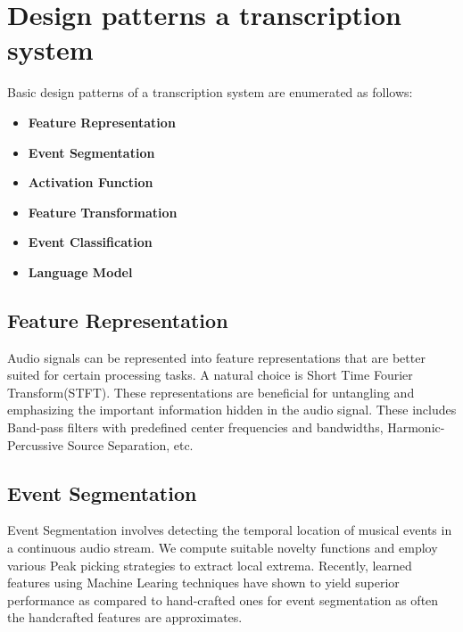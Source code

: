 \chapter{Design patterns a transcription system}

Basic design patterns of a transcription system are enumerated as follows:
\begin{itemize}
\item \textbf{Feature Representation}
\item \textbf{Event Segmentation}
\item \textbf{Activation Function}
\item \textbf{Feature Transformation}
\item \textbf{Event Classification}
\item \textbf{Language Model}
\end{itemize}

\section*{Feature Representation}

Audio signals can be represented into feature representations that are better suited for certain processing tasks. A natural choice is  Short Time Fourier Transform(STFT). These representations are beneficial for untangling and emphasizing the important information hidden in the audio signal. These includes Band-pass filters with predefined center frequencies and bandwidths, Harmonic-Percussive Source Separation, etc.

\section*{Event Segmentation}

Event Segmentation involves detecting the temporal location of musical events in a continuous audio stream. We compute suitable novelty functions and employ various Peak picking strategies to extract local extrema. Recently, learned features using Machine Learing techniques have shown to yield superior performance as compared to hand-crafted ones for event segmentation as often the handcrafted features are approximates. 

